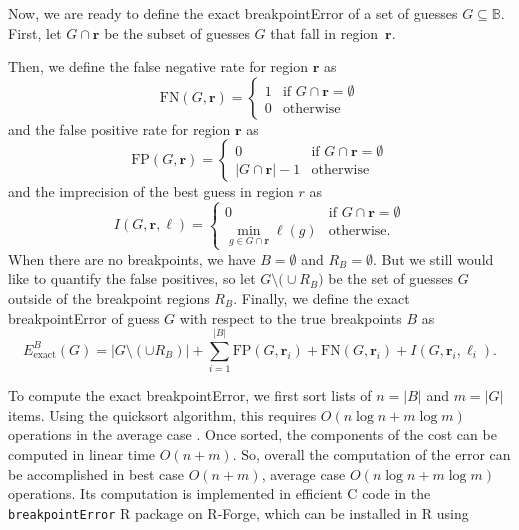 \documentclass{jsfds} %
\renewcommand{\r}{ \mathbf{ r} }
\begin{document}
Now, we are ready to define the exact breakpointError of a set of
guesses $G\subseteq\mathbb B$.
First, let $G \cap\r$ be the subset of guesses $G$ that fall in
region~$\r$. 

Then, we define the false negative rate for region $\r$ as 
\begin{equation}
  \label{eq:FN_i}
  \text{FN}(G,\r) = 
  \begin{cases}
    1 & \text{if } G\cap\r = \emptyset\\
    0 & \text{otherwise}
  \end{cases}
\end{equation}
and the false positive rate for region $\r$ as
\begin{equation}
  \label{eq:FP_i}
  \text{FP}(G,\r) =
  \begin{cases}
    0 & \text{if }G\cap\r = \emptyset\\
    |G\cap\r|-1 &\text{otherwise}
  \end{cases}
\end{equation}
and the imprecision of the best guess in region $r$ as
\begin{equation}
  \label{eq:imprecision}
  I(G,\r,\ell) =
  \begin{cases}
    0 & \text{if } G\cap\r = \emptyset\\
    \min_{g\in G\cap\r} \ell(g) & \text{otherwise}.
  \end{cases}
\end{equation}
When there are no breakpoints, we have $B=\emptyset$ and
$R_B=\emptyset$. But we still would like to quantify the false
positives, so let $G\setminus\big( \cup R_B\big) $ be the set of
guesses $G$ outside of the breakpoint regions $R_B$. Finally, we
define the exact breakpointError of guess $G$ with respect to the true
breakpoints $B$ as
\begin{equation}
  \label{eq:exact_breakpoint_cost}
  {E }_{\text{exact}}^B(G) =
  \big|G\setminus(\cup R_B)\big|
 + \sum_{i=1}^{|B|}\text{FP}(G,\r_i)+\text{FN}(G,\r_i)+I(G,\r_i,\ell_i).
\end{equation}

To compute the exact breakpointError, we first sort lists of $n=|B|$
and $m=|G|$ items. Using the quicksort algorithm, this requires
$O(n\log n + m\log m)$ operations in the average case
\citep{clrs}. Once sorted, the components of the cost can be computed
in linear time $O(n + m)$. So, overall the computation of the error
can be accomplished in best case $O(n + m)$, average case $O(n\log n +
m\log m)$ operations. Its computation is implemented in efficient C
code in the \verb|breakpointError| R package on R-Forge, which can be
installed in R using
\end{document}
